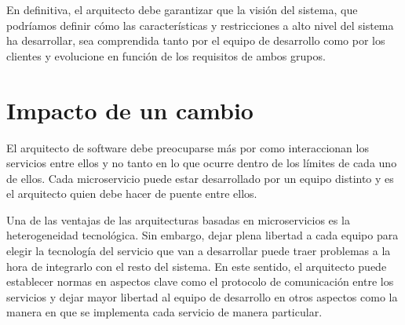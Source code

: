 \documentclass[11pt,a4paper]{article}
\begin{document}
En definitiva, el arquitecto debe garantizar que la visión del sistema, que podríamos definir cómo las características y restricciones a alto nivel del sistema ha desarrollar, sea comprendida tanto por el equipo de desarrollo como por los clientes y evolucione en función de los requisitos de ambos grupos.

\section{Impacto de un cambio}

El arquitecto de software debe preocuparse más por como interaccionan los servicios entre ellos y no tanto en lo que ocurre dentro de los límites de cada uno de ellos. Cada microservicio puede estar desarrollado por un equipo distinto y es el arquitecto quien debe hacer de puente entre ellos.

Una de las ventajas de las arquitecturas basadas en microservicios es la heterogeneidad tecnológica. Sin embargo, dejar plena libertad a cada equipo para elegir la tecnología del servicio que van a desarrollar puede traer problemas a la hora de integrarlo con el resto del sistema. En este sentido, el arquitecto puede establecer normas en aspectos clave como el protocolo de comunicación entre los servicios y dejar mayor libertad al equipo de desarrollo en otros aspectos como la manera en que se implementa cada servicio de manera particular.
\end{document}
